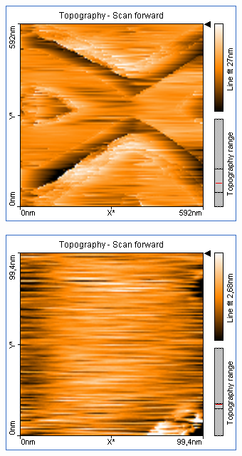 \centering
\begin{figure}
    \begin{subfigure}[b]{\picwidth}
        \includegraphics[width=\textwidth]{data/Graphit/pic_04_01_600nm}
        \caption{}
        \label{fig:graphit_04_01}
    \end{subfigure}\qquad
    \begin{subfigure}[b]{\picwidth}
        \includegraphics[width=\textwidth]{data/Graphit/pic_04_02_100nm}

\end{subfigure}
\end{figure}
